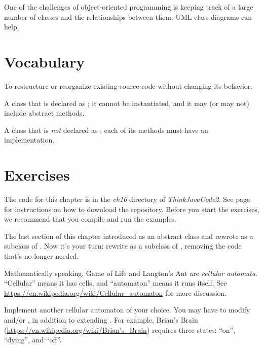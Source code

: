 One of the challenges of object-oriented programming is keeping track of a large number of classes and the relationships between them.
UML class diagrams can help.


\section{Vocabulary}

\begin{description}

To restructure or reorganize existing source code without changing its behavior.

A class that is declared as ; it cannot be instantiated, and it may (or may not) include abstract methods.

A class that is {\em not} declared as ; each of its methods must have an implementation.

\end{description}


\section{Exercises}

The code for this chapter is in the {\it ch16} directory of {\it ThinkJavaCode2}.
See page~\pageref{code} for instructions on how to download the repository.
Before you start the exercises, we recommend that you compile and run the examples.

\begin{exercise}

The last section of this chapter introduced  as an abstract class and rewrote  as a subclass of .
Now it's your turn: rewrite  as a subclass of , removing the code that's no longer needed.

\end{exercise}


\begin{exercise}

Mathematically speaking, Game of Life and Langton's Ant are {\em cellular automata}.
``Cellular'' means it has cells, and ``automaton'' means it runs itself.
See \url{https://en.wikipedia.org/wiki/Cellular_automaton} for more discussion.

Implement another cellular automaton of your choice.
You may have to modify  and/or , in addition to extending .
For example, Brian's Brain (\url{https://en.wikipedia.org/wiki/Brian's_Brain}) requires three states: ``on'', ``dying'', and ``off''.

\end{exercise}
